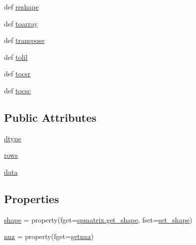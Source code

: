 \begin{DoxyCompactItemize}
def \hyperlink{classscipy_1_1sparse_1_1lil_1_1lil__matrix_a45770045ad6bdb2373be29e16ae2b999}{reshape}
\item 
def \hyperlink{classscipy_1_1sparse_1_1lil_1_1lil__matrix_a93042f436c7cad3fa9dcdcdb9c7b642e}{toarray}
\item 
def \hyperlink{classscipy_1_1sparse_1_1lil_1_1lil__matrix_a77a2f8441b5947234c0b90640b63d9a1}{transpose}
\item 
def \hyperlink{classscipy_1_1sparse_1_1lil_1_1lil__matrix_a8a9d40057eee581d65922ab66f0520f7}{tolil}
\item 
def \hyperlink{classscipy_1_1sparse_1_1lil_1_1lil__matrix_aabd160d77ba911f0b0baef69dfe0515e}{tocsr}
\item 
def \hyperlink{classscipy_1_1sparse_1_1lil_1_1lil__matrix_a935267ef3213fc3d65ee65c4039bf19f}{tocsc}
\end{DoxyCompactItemize}
\subsection*{Public Attributes}
\begin{DoxyCompactItemize}
\item 
\hyperlink{classscipy_1_1sparse_1_1lil_1_1lil__matrix_ab601e45efefff855971e7bbe3a1369cf}{dtype}
\item 
\hyperlink{classscipy_1_1sparse_1_1lil_1_1lil__matrix_a8af240f190999e0594d7a71d499c3f77}{rows}
\item 
\hyperlink{classscipy_1_1sparse_1_1lil_1_1lil__matrix_a5fc9c63ea62a2cffe37b7d0bc6694ec9}{data}
\end{DoxyCompactItemize}
\subsection*{Properties}
\begin{DoxyCompactItemize}
\item 
\hyperlink{classscipy_1_1sparse_1_1lil_1_1lil__matrix_a1ce3967d5fd211a7afc9d0b17d0c42c0}{shape} = property(fget=\hyperlink{classscipy_1_1sparse_1_1base_1_1spmatrix_af997a3ba2bc4ea75684e7c1d35b5f38c}{spmatrix.\+get\+\_\+shape}, fset=\hyperlink{classscipy_1_1sparse_1_1lil_1_1lil__matrix_a946f28e67b392383bf490004bd661522}{set\+\_\+shape})
\item 
\hyperlink{classscipy_1_1sparse_1_1lil_1_1lil__matrix_ab4d87e3e76b651d3b3e7590e4a60a0f3}{nnz} = property(fget=\hyperlink{classscipy_1_1sparse_1_1lil_1_1lil__matrix_ab60b3442a0e012f5329548da3ede0621}{getnnz})
\end{DoxyCompactItemize}


